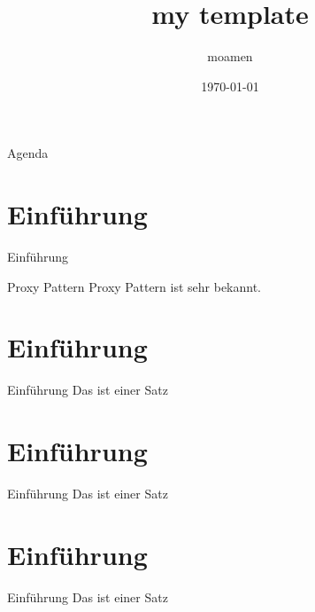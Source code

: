 \documentclass[hyperref={pdfpagemode=FullScreen}, aspectratio=1610]{beamer}
\author{moamen}
\title{my template}
\date{\today}
\begin{document}
	\begin{frame}[plain]
		\titlepage
	\end{frame}		
	

	\begin{frame}{Agenda}
		\tableofcontents
	\end{frame}
	
	\section{Einführung}
	\begin{frame}{Einführung}
		\begin{example}{Proxy Pattern}
			Proxy Pattern ist sehr bekannt. 
		\end{example}
	\end{frame}
	
	\section{Einführung}
	\begin{frame}{Einführung}
		Das ist einer Satz
	\end{frame}
	
	\section{Einführung}
	\begin{frame}{Einführung}
		Das ist einer Satz
	\end{frame}
	
	\section{Einführung}
	\begin{frame}{Einführung}
		Das ist einer Satz
	\end{frame}
	
\end{document}
